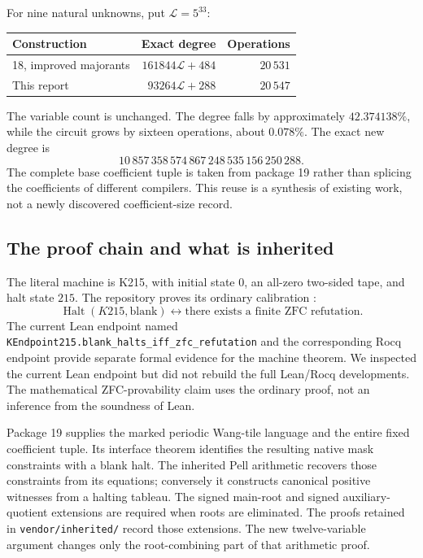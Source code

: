 For nine natural unknowns, put $\mathcal L=5^{33}$:
\begin{center}
\begin{tabular}{lrr}
\toprule
Construction & Exact degree & Operations\\
\midrule
18, improved majorants & $161844\mathcal L+484$ & $20\,531$\\
This report & $93264\mathcal L+288$ & $20\,547$\\
\bottomrule
\end{tabular}
\end{center}
The variable count is unchanged. The degree falls by approximately
$42.374138\%$, while the circuit grows by sixteen operations, about
$0.078\%$. The exact new degree is
\[
10\,857\,358\,574\,867\,248\,535\,156\,250\,288.
\]
The complete base coefficient tuple is taken from package 19 rather than
splicing the coefficients of different compilers. This reuse is a synthesis
of existing work, not a newly discovered coefficient-size record.

\subsection{The proof chain and what is inherited}
The literal machine is K215, with initial state $0$, an all-zero two-sided
tape, and halt state $215$. The repository proves its ordinary calibration
\cite{k215}:
\[
 \operatorname{Halt}(K215,\mathrm{blank})
 \longleftrightarrow
 \text{there exists a finite ZFC refutation}.
\]
The current Lean endpoint named
\texttt{KEndpoint215.blank\_halts\_iff\_zfc\_refutation} and the corresponding
Rocq endpoint provide separate formal evidence for the machine theorem.
We inspected the current Lean endpoint but did not rebuild the full
Lean/Rocq developments. The mathematical ZFC-provability claim uses the
ordinary proof, not an inference from the soundness of Lean.

Package 19 supplies the marked periodic Wang-tile language and the entire
fixed coefficient tuple. Its interface theorem identifies the resulting
native mask constraints with a blank halt. The inherited Pell arithmetic
recovers those constraints from its equations; conversely it constructs
canonical positive witnesses from a halting tableau. The signed main-root
and signed auxiliary-quotient extensions are required when roots are
eliminated. The proofs retained in \texttt{vendor/inherited/} record those
extensions. The new twelve-variable argument changes only the root-combining
part of that arithmetic proof.

